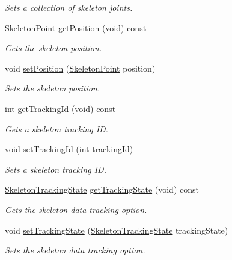 \begin{DoxyCompactItemize}
\begin{DoxyCompactList}\small\item\em \-Sets a collection of skeleton joints. \end{DoxyCompactList}\item 
\hyperlink{class_skeleton_point}{\-Skeleton\-Point} \hyperlink{class_skeleton_ac6d578c69c73d547bef051042a7ce75c}{get\-Position} (void) const 
\begin{DoxyCompactList}\small\item\em \-Gets the skeleton position. \end{DoxyCompactList}\item 
void \hyperlink{class_skeleton_afc11765a6cb9bed99e3a6a8aae81ea53}{set\-Position} (\hyperlink{class_skeleton_point}{\-Skeleton\-Point} position)
\begin{DoxyCompactList}\small\item\em \-Sets the skeleton position. \end{DoxyCompactList}\item 
int \hyperlink{class_skeleton_af8910df6f4246e71aa239571ac4cbce1}{get\-Tracking\-Id} (void) const 
\begin{DoxyCompactList}\small\item\em \-Gets a skeleton tracking \-I\-D. \end{DoxyCompactList}\item 
void \hyperlink{class_skeleton_aa013cfc71fdbb441a1ff228ec287cb12}{set\-Tracking\-Id} (int tracking\-Id)
\begin{DoxyCompactList}\small\item\em \-Sets a skeleton tracking \-I\-D. \end{DoxyCompactList}\item 
\hyperlink{skeleton_tracking_state_8h_a970dd6d8f4fed3a223e0ae2dca36435c}{\-Skeleton\-Tracking\-State} \hyperlink{class_skeleton_a6f2302e9a82950bc472a59f14d2cd928}{get\-Tracking\-State} (void) const 
\begin{DoxyCompactList}\small\item\em \-Gets the skeleton data tracking option. \end{DoxyCompactList}\item 
void \hyperlink{class_skeleton_a7d36116cb6cf9d9bd6a96e3cae1fc52f}{set\-Tracking\-State} (\hyperlink{skeleton_tracking_state_8h_a970dd6d8f4fed3a223e0ae2dca36435c}{\-Skeleton\-Tracking\-State} tracking\-State)
\begin{DoxyCompactList}\small\item\em \-Sets the skeleton data tracking option. \end{DoxyCompactList}\end{DoxyCompactItemize}


